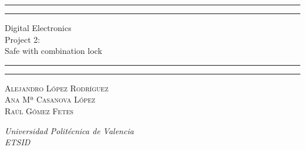 \begin{titlepage} %

    \selectfont
	\centering %
	\scshape %
	\vspace*{\baselineskip} %
	
	\vspace{3\baselineskip}
	
	\rule{\textwidth}{1.6pt}\vspace*{-\baselineskip}\vspace*{2pt} %
	\rule{\textwidth}{0.4pt} %
	
	\vspace{0.75\baselineskip} %
	
	{\LARGE Digital Electronics\\ Project 2:\\Safe with combination lock\\} %
	
	\vspace{0.75\baselineskip} %
	
	\rule{\textwidth}{0.4pt}\vspace*{-\baselineskip}\vspace{3.2pt} %
	\rule{\textwidth}{1.6pt} %
	
	\vspace{1.5\baselineskip} %


	
	{\scshape\Large Alejandro López Rodríguez \\ Ana Mª Casanova López \\ Raúl Gómez Fetes \\} %
	
	\vspace{1.5\baselineskip} %
	
	\textit{Universidad Politécnica de Valencia\\ ETSID\\} 
	
	\vspace{2\baselineskip} %
	\thedate
	
	\vfill %

\end{titlepage}